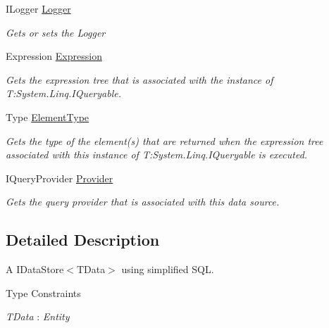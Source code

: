 \begin{DoxyCompactItemize}
I\+Logger \hyperlink{classCqrs_1_1DataStores_1_1SqlDataStore_a44cd63b587e42b278177070eab8404f7_a44cd63b587e42b278177070eab8404f7}{Logger}
\begin{DoxyCompactList}\small\item\em Gets or sets the Logger \end{DoxyCompactList}\item 
Expression \hyperlink{classCqrs_1_1DataStores_1_1SqlDataStore_a1fb28f14cf7762331ec9e7d5efe19c75_a1fb28f14cf7762331ec9e7d5efe19c75}{Expression}
\begin{DoxyCompactList}\small\item\em Gets the expression tree that is associated with the instance of T\+:\+System.\+Linq.\+I\+Queryable. \end{DoxyCompactList}\item 
Type \hyperlink{classCqrs_1_1DataStores_1_1SqlDataStore_ab96bad4f637c7cfc95e97598c8753d02_ab96bad4f637c7cfc95e97598c8753d02}{Element\+Type}
\begin{DoxyCompactList}\small\item\em Gets the type of the element(s) that are returned when the expression tree associated with this instance of T\+:\+System.\+Linq.\+I\+Queryable is executed. \end{DoxyCompactList}\item 
I\+Query\+Provider \hyperlink{classCqrs_1_1DataStores_1_1SqlDataStore_aec0093c6fe2adc41899c2418a0e324d9_aec0093c6fe2adc41899c2418a0e324d9}{Provider}
\begin{DoxyCompactList}\small\item\em Gets the query provider that is associated with this data source. \end{DoxyCompactList}\end{DoxyCompactItemize}


\subsection{Detailed Description}
A I\+Data\+Store$<$\+T\+Data$>$ using simplified S\+QL. 

\begin{Desc}
\item[Type Constraints]\begin{description}
\item[{\em T\+Data} : {\em Entity}]\end{description}
\end{Desc}


